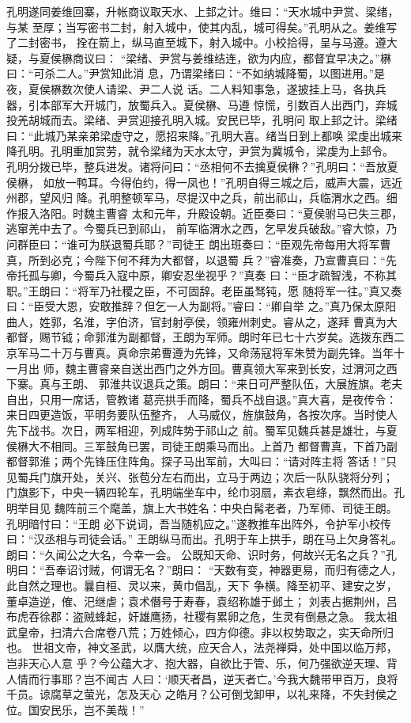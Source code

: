 孔明遂同姜维回寨，升帐商议取天水、上邽之计。维曰：“天水城中尹赏、梁绪，与某
至厚；当写密书二封，射入城中，使其内乱，城可得矣。”孔明从之。姜维写了二封密书，
拴在箭上，纵马直至城下，射入城中。小校拾得，呈与马遵。遵大疑，与夏侯楙商议曰：
“梁绪、尹赏与姜维结连，欲为内应，都督宜早决之。”楙曰：“可杀二人。”尹赏知此消
息，乃谓梁绪曰：“不如纳城降蜀，以图进用。”是夜，夏侯楙数次使人请梁、尹二人说
话。二人料知事急，遂披挂上马，各执兵器，引本部军大开城门，放蜀兵入。夏侯楙、马遵
惊慌，引数百人出西门，弃城投羌胡城而去。梁绪、尹赏迎接孔明入城。安民已毕，孔明问
取上邽之计。梁绪曰：“此城乃某亲弟梁虚守之，愿招来降。”孔明大喜。绪当日到上都唤
梁虔出城来降孔明。孔明重加赏劳，就令梁绪为天水太守，尹赏为冀城令，梁虔为上邽令。
孔明分拨已毕，整兵进发。诸将问曰：“丞相何不去擒夏侯楙？”孔明曰：“吾放夏侯楙，
如放一鸭耳。今得伯约，得一凤也！”孔明自得三城之后，威声大震，远近州郡，望风归
降。孔明整顿军马，尽提汉中之兵，前出祁山，兵临渭水之西。细作报入洛阳。时魏主曹睿
太和元年，升殿设朝。近臣奏曰：“夏侯驸马已失三郡，逃窜羌中去了。今蜀兵已到祁山，
前军临渭水之西，乞早发兵破敌。”睿大惊，乃问群臣曰：“谁可为朕退蜀兵耶？”司徒王
朗出班奏曰：“臣观先帝每用大将军曹真，所到必克；今陛下何不拜为大都督，以退蜀
兵？”睿准奏，乃宣曹真曰：“先帝托孤与卿，今蜀兵入寇中原，卿安忍坐视乎？”真奏
曰：“臣才疏智浅，不称其职。”王朗曰：“将军乃社稷之臣，不可固辞。老臣虽驽钝，愿
随将军一往。”真又奏曰：“臣受大恩，安敢推辞？但乞一人为副将。”睿曰：“卿自举
之。”真乃保太原阳曲人，姓郭，名淮，字伯济，官封射亭侯，领雍州刺史。睿从之，遂拜
曹真为大都督，赐节钺；命郭淮为副都督，王朗为军师。朗时年已七十六岁矣。选拨东西二
京军马二十万与曹真。真命宗弟曹遵为先锋，又命荡寇将军朱赞为副先锋。当年十一月出
师，魏主曹睿亲自送出西门之外方回。曹真领大军来到长安，过渭河之西下寨。真与王朗、
郭淮共议退兵之策。朗曰：“来日可严整队伍，大展旌旗。老夫自出，只用一席话，管教诸
葛亮拱手而降，蜀兵不战自退。”真大喜，是夜传令：来日四更造饭，平明务要队伍整齐，
人马威仪，旌旗鼓角，各按次序。当时使人先下战书。次日，两军相迎，列成阵势于祁山之
前。蜀军见魏兵甚是雄壮，与夏侯楙大不相同。三军鼓角已罢，司徒王朗乘马而出。上首乃
都督曹真，下首乃副都督郭淮；两个先锋压住阵角。探子马出军前，大叫曰：“请对阵主将
答话！”只见蜀兵门旗开处，关兴、张苞分左右而出，立马于两边；次后一队队骁将分列；
门旗影下，中央一辆四轮车，孔明端坐车中，纶巾羽扇，素衣皂绦，飘然而出。孔明举目见
魏阵前三个麾盖，旗上大书姓名：中央白髯老者，乃军师、司徒王朗。孔明暗忖曰：“王朗
必下说词，吾当随机应之。”遂教推车出阵外，令护军小校传曰：“汉丞相与司徒会话。”
王朗纵马而出。孔明于车上拱手，朗在马上欠身答礼。朗曰：“久闻公之大名，今幸一会。
公既知天命、识时务，何故兴无名之兵？”孔明曰：“吾奉诏讨贼，何谓无名？”朗曰：
“天数有变，神器更易，而归有德之人，此自然之理也。曩自桓、灵以来，黄巾倡乱，天下
争横。降至初平、建安之岁，董卓造逆，傕、汜继虐；袁术僭号于寿春，袁绍称雄于邺土；
刘表占据荆州，吕布虎吞徐郡：盗贼蜂起，奸雄鹰扬，社稷有累卵之危，生灵有倒悬之急。
我太祖武皇帝，扫清六合席卷八荒；万姓倾心，四方仰德。非以权势取之，实天命所归也。
世祖文帝，神文圣武，以膺大统，应天合人，法尧禅舜，处中国以临万邦，岂非天心人意
乎？今公蕴大才、抱大器，自欲比于管、乐，何乃强欲逆天理、背人情而行事耶？岂不闻古
人曰：‘顺天者昌，逆天者亡。’今我大魏带甲百万，良将千员。谅腐草之萤光，怎及天心
之皓月？公可倒戈卸甲，以礼来降，不失封侯之位。国安民乐，岂不美哉！”

